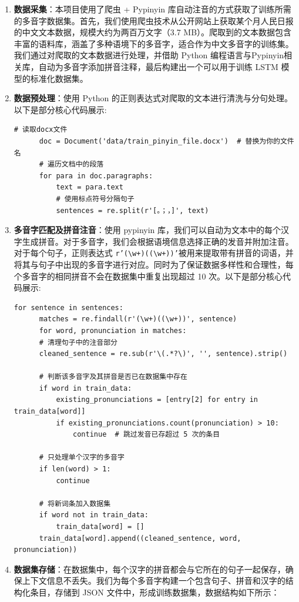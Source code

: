\documentclass[12pt,hyperref,a4paper,UTF8]{ctexart}
\begin{document}
\begin{enumerate}
    \item \textbf{数据采集}：本项目使用了爬虫 + Pypinyin 库自动注音的方式获取了训练所需的多音字数据集。首先，我们使用爬虫技术从公开网站上获取某个月人民日报的中文文本数据，规模大约为两百万文字（3.7 MB）。爬取到的文本数据包含丰富的语料库，涵盖了多种语境下的多音字，适合作为中文多音字的训练集。我们通过对爬取的文本数据进行处理，并借助 Python 编程语言与Pypinyin相关库，自动为多音字添加拼音注释，最后构建出一个可以用于训练 LSTM 模型的标准化数据集。
    \item \textbf{数据预处理}：使用 Python 的正则表达式对爬取的文本进行清洗与分句处理。以下是部分核心代码展示:
  \begin{lstlisting}[caption={方法一数据预处理}, label={lst:example}]
      # 读取docx文件
      doc = Document('data/train_pinyin_file.docx')  # 替换为你的文件名
      # 遍历文档中的段落
      for para in doc.paragraphs:
          text = para.text
          # 使用标点符号分隔句子
          sentences = re.split(r'[。；，]', text)
  \end{lstlisting}
    \item \textbf{多音字匹配及拼音注音}：使用 pypinyin 库，我们可以自动为文本中的每个汉字生成拼音。对于多音字，我们会根据语境信息选择正确的发音并附加注音。对于每个句子，正则表达式 \texttt{r'(\textbackslash w+)((\textbackslash w+))'}被用来提取带有拼音的词语，并将其与句子中出现的多音字进行对应。同时为了保证数据多样性和合理性，每个多音字的相同拼音不会在数据集中重复出现超过 10 次。以下是部分核心代码展示:
  \begin{lstlisting}[caption={方法一多音字匹配及拼音注音}, label={lst:example}]
  for sentence in sentences:
      matches = re.findall(r'(\w+)((\w+))', sentence)
      for word, pronunciation in matches:
      # 清理句子中的注音部分
      cleaned_sentence = re.sub(r'\(.*?\)', '', sentence).strip()
      
      # 判断该多音字及其拼音是否已在数据集中存在
      if word in train_data:
          existing_pronunciations = [entry[2] for entry in train_data[word]]
          if existing_pronunciations.count(pronunciation) > 10:
              continue  # 跳过发音已存超过 5 次的条目
      
      # 只处理单个汉字的多音字
      if len(word) > 1:
          continue
  
      # 将新词条加入数据集
      if word not in train_data:
          train_data[word] = []
      train_data[word].append((cleaned_sentence, word, pronunciation))
  \end{lstlisting}
  \item \textbf{数据集存储}：在数据集中，每个汉字的拼音都会与它所在的句子一起保存，确保上下文信息不丢失。我们为每个多音字构建一个包含句子、拼音和汉字的结构化条目，存储到 JSON 文件中，形成训练数据集，数据结构如下所示：
  

\end{enumerate}
\end{document}
